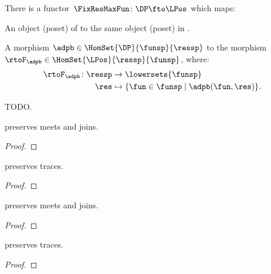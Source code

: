 \begin{lemma}
\label{lem:confunctor}
There is a functor~$\FixResMaxFun\colon \DP \fto \LPos$ which maps:
\begin{compactenum}
\item An object (poset) of \DP to the same object (poset) in \LPos.
\item A morphism $\adpb \in \HomSet{\DP}{\funsp}{\ressp}$ to the morphism~$\rtoF_\adpb\in \HomSet{\LPos}{\ressp}{\funsp}$, where:
\begin{equation*}
    \begin{aligned}
    \rtoF_\adpb\colon \ressp &\to \lowersets{\funsp}\\
    \res&\mapsto \{ \fun \in \funsp \mid \adpb(\fun,\res)\}.
    \end{aligned}
\end{equation*}
\end{compactenum}
\end{lemma}

\begin{marginfigure}
\begin{center}
\end{center}
    \caption{TODO.}
\end{marginfigure}



\begin{lemma}
    \FixFunMinRes preserves meets and joins.
\end{lemma}
\begin{proof}
\end{proof}

\begin{lemma}
    \FixFunMinRes preserves traces.
\end{lemma}
\begin{proof}
\end{proof}

\begin{lemma}
    \FixResMaxFun preserves meets and joins.
\end{lemma}
\begin{proof}
\end{proof}

\begin{lemma}
    \FixResMaxFun preserves traces.
\end{lemma}
\begin{proof}
\end{proof}